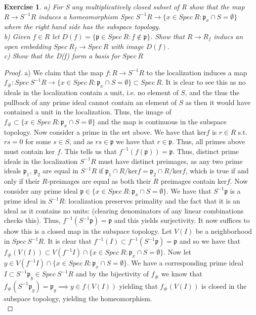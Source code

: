 \documentclass{article}
\newcommand{\fk}[1]{\mathfrak{#1}}
\newtheorem{exercise}{Exercise}
\begin{document}
\begin{exercise}
  a) For S any multiplicatively closed subset of R show that the map $R \to S^{-1}R$ induces a homeomorphism Spec $S^{-1}R \to \{x \in Spec \ R: \fk{p}_{x} \cap S = \emptyset \}$ where the right hand side has the subspace topology. \\
  b) Given $f \in R$ let $D(f) = \{ \fk{p} \in Spec \ R: f \notin \fk{p}\}$. Show that $R \to R_{f}$ inducs an open embedding $Spec \ R_{f} \to Spec \ R$ with image $D(f)$.\\
  c) Show that the D(f) form a basis for $Spec \ R$
\end{exercise}
\begin{proof}
  a) We claim that the map $f: R \to S^{-1}R$ to the localization induces a map $f_{\#}: Spec \ S^{-1}R \to \{x \in Spec \ R: \fk{p}_{x} \cap S = \emptyset \} \subset Spec \ R$. It is clear to see this as no ideals in the localization contain a unit, i.e. no element of $S$, and the thus the pullback of any prime ideal cannot contain an element of $S$ as then it would have contained a unit in the localization. Thus, the image of $f_{\#} \subset \{x \in Spec \ R: \fk{p}_{x} \cap S = \emptyset \}$ and the map is continuous in the subspace topology. Now consider a prime in the set above. We have that ker$f$ is $r \in R$ s.t. $rs = 0$ for some $s \in S$, and as $rs \in \fk{p}$ we have that $r \in \fk{p}$. Thus, all primes above must contain ker $f$. This tells us that $f^{-1}(f(\fk{p})) = \fk{p}$. Thus, distinct prime ideals in the localization $S^{-1}R$ must have distinct preimages, as any two prime ideals $\fk{p}_{1}, \ \fk{p}_{2}$ are equal in $S^{-1}R$ if $\fk{p}_{1} \cap R/\text{ker}f = \fk{p}_{2} \cap R/\text{ker}f$, which is true if and only if their $R$-preimages are equal as both their $R$ preimages contain ker$f$. Now consider any prime ideal $\fk{p} \in \{x \in Spec \ R: \fk{p}_{x} \cap S = \emptyset \}$. We have that $S^{-1}\fk{p}$ is a prime ideal in $S^{-1}R$: localization preserves primality and the fact that it is an ideal as it contains no units: (clearing denominators of any linear combinations checks this). Thus, $f^{-1}(S^{-1}\fk{p}) = \fk{p}$ and this yields surjectivity. It now suffices to show this is a closed map in the subspace topology. Let $V(I)$ be a neighborhood in $Spec \ S^{-1}R$. It is clear that $f^{-1}(I) \subset f^{-1} (S^{-1}\fk{p}) = \fk{p}$ and so we have that $f_{\#}(V(I)) \subset V(f^{-1}I) \cap\{x \in Spec \ R: \fk{p}_{x} \cap S = \emptyset \}$. Now let $y \in V(f^{-1}I) \cap \{x \in Spec \ R: \fk{p}_{x} \cap S = \emptyset \}$. We have a corresponding prime ideal $I \subset S^{-1}\fk{p}_{y} \in Spec \ S^{-1}R$ and by the bijectivity of $f_{\#}$ we know that $f_{\#}(S^{-1}\fk{p}_{y}) = \fk{p}_{y} \implies y \in f(V(I))$ yielding that $f_{\#}(V(I))$ is closed in the subspace topology, yielding the homeomorphism. \\
  

\end{proof}
\end{document}
